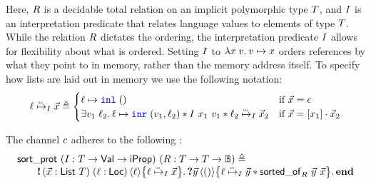 \noindent Here, $R$ is a decidable total relation on an implicit polymorphic type
$T$, and $I$ is an interpretation predicate that relates language
values to elements of type $T$.
While the relation $R$ dictates the ordering, the interpretation predicate
$I$ allows for flexibility about what is ordered.
Setting $I$ to \eg $\Lam \var\;\val. \val \mapsto \var$
orders references by what they point to in memory, rather than the memory address
itself.
To specify how lists are laid out in memory we use the following notation:
\begin{equation*}
\listrefI \interpvar \loc {\vec \var} \eqdef
  \begin{cases}
  \loc \mapsto \Inl\;\TT & \textnormal{if $\vec\var = \nil$} \\
  \Exists \val_1\;\loc_2.
    \loc \mapsto \Inr\;(\val_1,\loc_2) * \interpvar\ \var_1\ \val_1 *
    \listrefI \interpvar {\loc_2} {\vec\var_2}
    & \textnormal{if $\vec\var = [\var_1] \cdot \vec\var_2$}
  \end{cases}
\end{equation*}

\noindent
The channel $c$ adheres to the following \pnameSingular:
\begin{equation*}
\begin{array}{l}
\listsortprotname\ (\interpvar : \tvar \to \Val \to \Prop)
\ (\relvar : \tvar \to \tvar \to \bool) \eqdef \\
\qquad
  \sendprot{(\vec{\var}:\List\ \tvar)\;(\loc : \Loc)}{\loc}
  {\listrefI \interpvar \loc {\vec\var}}{
\recvprot{\vec{\varB}}{\TT}
  {\listrefI \interpvar \loc {\vec \varB} *
   \sortedof {\vec\varB} {\vec\var} \relvar}{
      \protend}}
\end{array}
\end{equation*}

